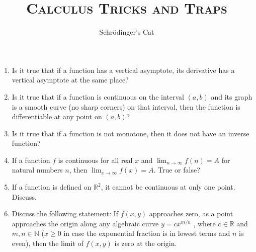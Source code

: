 \documentclass[10pt,a4paper]{article}
\title{\textsc{Calculus Tricks and Traps}}
\date{}
\author{Schrödinger's Cat}
\begin{document}
\maketitle
\newpage

\begin{enumerate}
\item Is it true that if a function has a vertical asymptote, its derivative has a vertical asymptote at the same place?
\item Is it true that if a function is continuous on the interval $(a,b)$ and its graph is a smooth curve (no sharp corners) on that interval, then the function is differentiable at any point on $(a, b)$?
\item Is it true that if  a function is not monotone, then it does not have an inverse function?
\item If a function $f$ is continuous for all real $x$ and $\lim_{n \to \infty} f(n) = A$ for natural numbers $n$, then $\lim_{x \to \infty} f(x) = A$. True or false?
\item If a function is defined on $\mathbb{R}^2$, it cannot be continuous at only one point. Discuss.
\item Discuss the following statement: If $f(x,y)$ approaches zero, as a point approaches the origin along any algebraic curve $y = cx^{m/n}$ , where $c \in \mathbb{R}$ and $m,n \in \mathbb{N}$ ($x \geq 0$ in case the exponential fraction is in lowest terms and $n$ is even), then the limit of $f(x,y)$ is zero at the origin.
\end{enumerate}
\end{document}

